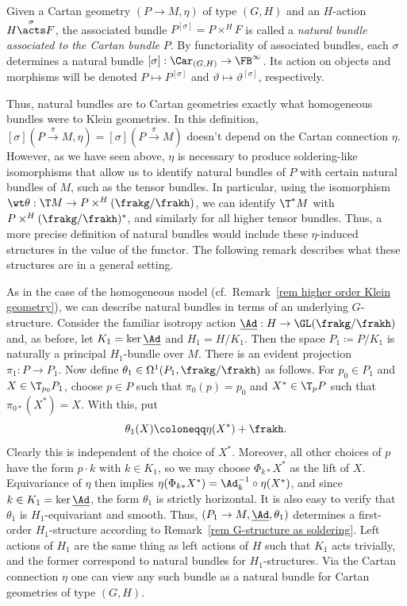 \begin{defn}
    Given a Cartan geometry $(P\to M,\eta)$ of type $(G,H)$ and an $H$-action $H\overset{\sigma}{\acts}F$, the associated bundle $P^{[\sigma]}=P\times^H F$ is called a \emph{natural bundle associated to the Cartan bundle} $P$. By functoriality of associated bundles, each $\sigma$ determines a natural bundle $[\sigma]:\Car_{(G,H)}\to \FB^\infty$. Its action on objects and morphisms will be denoted $P\mapsto P^{[\sigma]}$ and $\vartheta\mapsto \vartheta^{[\sigma]}$, respectively.
\end{defn}

Thus, natural bundles are to Cartan geometries exactly what homogeneous bundles were to Klein geometries. In this definition, $[\sigma](P\overset{\pi}{\to} M,\eta)=[\sigma](P\overset{\pi}{\to} M)$ doesn't depend on the Cartan connection $\eta$. However, as we have seen above, $\eta$ is necessary to produce soldering-like isomorphisms that allow us to identify natural bundles of $P$ with certain natural bundles of $M$, such as the tensor bundles. In particular, using the isomorphism $\wt\theta:\T M\to P\times^H(\frakg\slash\frakh)$, we can identify $\T^\ast M$ with $P\times^H(\frakg\slash\frakh)^\ast$, and similarly for all higher tensor bundles. Thus, a more precise definition of natural bundles would include these $\eta$-induced structures in the value of the functor. The following remark describes what these structures are in a general setting.

\begin{rem}
    As in the case of the homogeneous model (cf.\ Remark~\ref{rem higher order Klein geometry}), we can describe natural bundles in terms of an underlying $G$-structure. Consider the familiar isotropy action $\underline{\Ad}:H\to \GL(\frakg\slash\frakh)$ and, as before, let $K_1=\ker \underline{\Ad}$ and $H_1=H\slash K_1$. Then the space $P_1\coloneqq P\slash K_1$ is naturally a principal $H_1$-bundle over $M$. There is an evident projection $\pi_1:P\to P_1$. Now define $\theta_1\in\Omega^1(P_1,\frakg\slash\frakh)$ as follows. For $p_0\in P_1$ and $X\in \T_{p_0}P_1$, choose $p\in P$ such that $\pi_0(p)=p_0$ and $X^\ast\in \T_p P$ such that $\pi_{0\ast}(X^\ast)=X$. With this, put 
    \[\theta_1(X)\coloneqq \eta(X^\ast)+\frakh.\]
    Clearly this is independent of the choice of $X^\ast$. Moreover, all other choices of $p$ have the form $p\cdot k$ with $k\in K_1$, so we may choose $\Phi_{k\ast}X^\ast$ as the lift of $X$. Equivariance of $\eta$ then implies $\eta(\Phi_{k\ast }X^\ast)=\Ad_k^{-1}\circ \eta(X^\ast)$, and since $k\in K_1=\ker \underline{\Ad}$, the form $\theta_1$ is strictly horizontal. It is also easy to verify that $\theta_1$ is $H_1$-equivariant and smooth. Thus, $(P_1\to M,\underline{\Ad},\theta_1)$ determines a first-order $H_1$-structure according to Remark~\ref{rem G-structure as soldering}. Left actions of $H_1$ are the same thing as left actions of $H$ such that $K_1$ acts trivially, and the former correspond to natural bundles for $H_1$-structures. Via the Cartan connection $\eta$ one can view any such bundle as a natural bundle for Cartan geometries of type $(G,H)$.
\end{rem}


